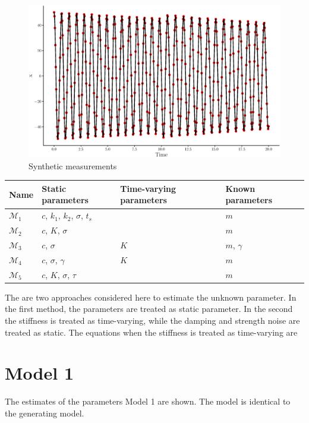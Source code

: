 \documentclass[]{elsarticle}
\begin{document}
\begin{figure}[!htb]
\centering
\includegraphics[width=\linewidth,keepaspectratio]{./figs/Case00/data.eps}
\caption{Synthetic measurements}
\label{fig:data}
\end{figure}


\begin{table}[!htb]
\begin{tabular}{l|lll}
\hline
Name & Static parameters & Time-varying parameters & Known parameters   \\
\hline
$\mathcal{M}_1$ & $c$, $k_1$, $k_2$, $\sigma$, $t_s$ &  & $m$   \\
$\mathcal{M}_2$ & $c$, $K$, $\sigma$ &  & $m$   \\
$\mathcal{M}_3$ & $c$, $\sigma$ & $K$ & $m$, $\gamma$ \\
$\mathcal{M}_4$ & $c$, $\sigma$, $\gamma$ & $K$ & $m$  \\
$\mathcal{M}_5$ & $c$, $K$, $\sigma$, $\tau$ & & $m$ \\
\hline
\end{tabular}
\end{table}

The are two approaches considered here to estimate the unknown parameter. In the first method, the parameters are treated as static parameter. In the second the stiffness is treated as time-varying, while the damping and strength noise are treated as static. The equations when the stiffness is treated as time-varying are

\section*{Model 1}

The estimates of the parameters Model 1 are shown. The model is identical to the generating model.
\end{document}
